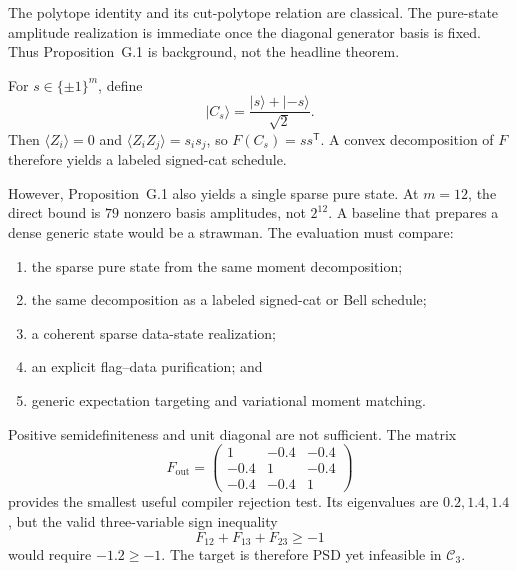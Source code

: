 \documentclass[11pt]{article}
\newcommand{\SubSect}[1]{\vspace{0.22em}{\large\bfseries #1}\par\vspace{0.18em}}
\begin{document}
The polytope identity and its cut-polytope relation are classical. The pure-state amplitude realization is immediate once the diagonal generator basis is fixed. Thus Proposition~G.1 is background, not the headline theorem.

\clearpage
\setcounter{page}{49}
\thispagestyle{plain}
\fontsize{9.8}{11.8}\selectfont
\SubSect{G.2\quad Signed cats and the baseline they do not defeat}
For $s\in\{\pm1\}^m$, define
\begin{equation}
  \lvert C_s\rangle=\frac{\lvert s\rangle+\lvert-s\rangle}{\sqrt2}.
  \tag{88}
\end{equation}
Then $\langle Z_i\rangle=0$ and $\langle Z_iZ_j\rangle=s_is_j$, so $F(C_s)=ss^{\mathsf T}$. A convex decomposition of $F$ therefore yields a labeled signed-cat schedule.

However, Proposition~G.1 also yields a single sparse pure state. At $m=12$, the direct bound is $79$ nonzero basis amplitudes, not $2^{12}$. A baseline that prepares a dense generic state would be a strawman. The evaluation must compare:
\begin{enumerate}[label=(\roman*),leftmargin=2.2em,itemsep=0pt,topsep=0.2em]
\item the sparse pure state from the same moment decomposition;
\item the same decomposition as a labeled signed-cat or Bell schedule;
\item a coherent sparse data-state realization;
\item an explicit flag--data purification; and
\item generic expectation targeting and variational moment matching.
\end{enumerate}

\SubSect{G.3\quad A positive-semidefinite matrix outside the full sector}
Positive semidefiniteness and unit diagonal are not sufficient. The matrix
\begin{equation}
  F_{\mathrm{out}}=
  \begin{pmatrix}
    1&-0.4&-0.4\\
    -0.4&1&-0.4\\
    -0.4&-0.4&1
  \end{pmatrix}
  \tag{89}
\end{equation}
provides the smallest useful compiler rejection test. Its eigenvalues are $0.2,1.4,1.4$, but the valid three-variable sign inequality
\begin{equation}
  F_{12}+F_{13}+F_{23}\ge-1
  \tag{90}
\end{equation}
would require $-1.2\ge-1$. The target is therefore PSD yet infeasible in $\mathcal C_3$.
\end{document}
